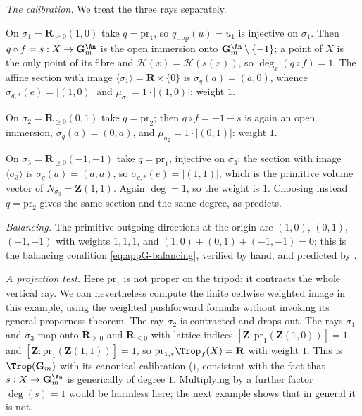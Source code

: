 \begin{example}
\emph{The calibration.} We treat the three rays separately.

On $\sigma_1=\mathbf R_{\ge0}(1,0)$ take $q=\mathrm{pr}_1$, so
$q_{\mathrm{trop}}(u)=u_1$ is injective on $\sigma_1$. Then
$q\circ f=s:X\to\mathbf G_m^{\An}$ is the open immersion onto
$\mathbf G_m^{\An}\setminus\{-1\}$; a point of $X$ is the only point of its
fibre and $\mathcal H(x)=\mathcal H(s(x))$, so $\deg_x(q\circ f)=1$. The
affine section with image $\langle\sigma_1\rangle=\mathbf R\times\{0\}$ is
$\sigma_q(a)=(a,0)$, whence $\sigma_{q,*}(e)=|(1,0)|$ and
$\mu_{\sigma_1}=1\cdot|(1,0)|$: weight $1$.

On $\sigma_2=\mathbf R_{\ge0}(0,1)$ take $q=\mathrm{pr}_2$; then
$q\circ f=-1-s$ is again an open immersion, $\sigma_q(a)=(0,a)$, and
$\mu_{\sigma_2}=1\cdot|(0,1)|$: weight $1$.

On $\sigma_3=\mathbf R_{\ge0}(-1,-1)$ take $q=\mathrm{pr}_1$, injective on
$\sigma_3$; the section with image $\langle\sigma_3\rangle$ is
$\sigma_q(a)=(a,a)$, so $\sigma_{q,*}(e)=|(1,1)|$, which is the primitive
volume vector of $N_{\sigma_3}=\mathbf Z(1,1)$. Again $\deg=1$, so the weight
is $1$. Choosing instead $q=\mathrm{pr}_2$ gives the same section and the
same degree, as  predicts.

\emph{Balancing.} The primitive outgoing directions at the origin are
$(1,0)$, $(0,1)$, $(-1,-1)$ with weights $1,1,1$, and
$(1,0)+(0,1)+(-1,-1)=0$; this is the balancing condition
\eqref{eq:appG-balancing}, verified by hand, and predicted by
.

\emph{A projection test.} Here $\mathrm{pr}_1$ is not proper on the tripod:
it contracts the whole vertical ray. We can nevertheless compute the
finite cellwise weighted image in this example, using the weighted
pushforward formula without invoking its general properness theorem. The ray
$\sigma_2$ is contracted and drops out. The rays $\sigma_1$ and $\sigma_3$
map onto $\mathbf R_{\ge0}$ and $\mathbf R_{\le0}$ with lattice indices
$[\mathbf Z:\mathrm{pr}_1(\mathbf Z(1,0))]=1$ and
$[\mathbf Z:\mathrm{pr}_1(\mathbf Z(1,1))]=1$, so
$\mathrm{pr}_{1,*}\Trop_f(X)=\mathbf R$ with weight $1$. This is
$\Trop(\mathbf G_m)$ with its canonical calibration
(), consistent with the fact that
$s:X\to\mathbf G_m^{\An}$ is generically of degree $1$. Multiplying by a
further factor $\deg(s)=1$ would be harmless here; the next example shows
that in general it is not.
\end{example}

